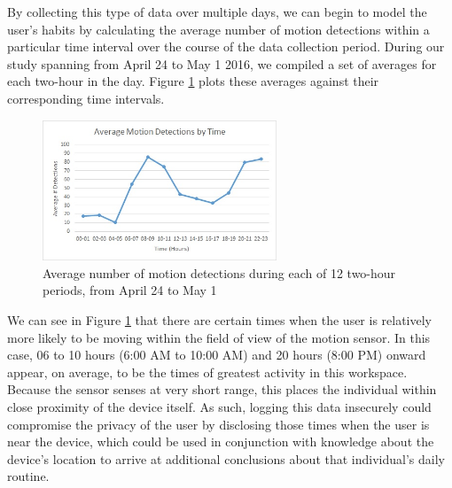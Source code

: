 \documentclass[conference]{IEEEtran}
\begin{document}
By collecting this type of data over multiple days, we can begin to model the user's habits by calculating the average number of motion detections within a particular time interval over the course of the data collection period.
During our study spanning from April 24 to May 1 2016, we compiled a set of averages for each two-hour in the day. Figure \ref{fig:chartavg} plots these averages against their corresponding time intervals.
\begin{figure}[!ht]
  \centering
  \includegraphics[width=2.75in]{images/Chart-averages.jpg}
  \caption{Average number of motion detections during each of 12 two-hour periods, from April 24 to May 1}
  \label{fig:chartavg}
\end{figure}

We can see in Figure \ref{fig:chartavg} that there are certain times when the user is relatively more likely to be moving within the field of view of the motion sensor.
In this case, 06 to 10 hours (6:00 AM to 10:00 AM) and 20 hours (8:00 PM) onward appear, on average, to be the times of greatest activity in this workspace.
Because the sensor senses at very short range, this places the individual within close proximity of the device itself.
As such, logging this data insecurely could compromise the privacy of the user by disclosing those times when the user is near the device, which could be used in conjunction with knowledge about the device's location to arrive at additional conclusions about that individual's daily routine.
\end{document}
